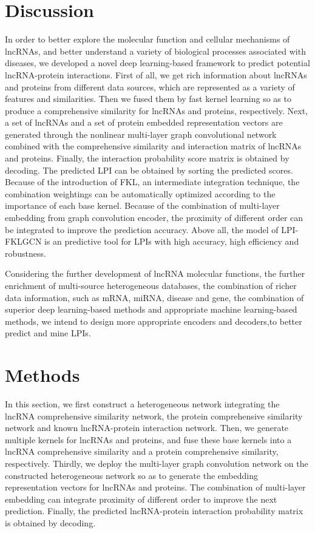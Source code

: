 \documentclass[fleqn,10pt]{wlscirep}
\begin{document}
\section*{Discussion}
In order to better explore the molecular function and cellular mechanisms of lncRNAs, and better understand a variety of biological processes associated with diseases, we developed a novel deep learning-based framework to predict potential lncRNA-protein interactions. First of all, we get rich information about lncRNAs and proteins from different data sources, which are represented as a variety of features and similarities. Then we fused them by fast kernel learning so as to produce a comprehensive similarity for lncRNAs and proteins, respectively. Next, a set of lncRNAs and a set of protein embedded representation vectors are generated through the nonlinear multi-layer graph convolutional network combined with the comprehensive similarity and interaction matrix of lncRNAs and proteins. Finally, the interaction probability score matrix is obtained by decoding. The predicted LPI can be obtained by sorting the predicted scores. Because of the introduction of FKL, an intermediate integration technique, the combination weightings can be automatically optimized according to the importance of each base kernel. Because of the combination of multi-layer embedding from graph convolution encoder, the proximity of different order can be integrated to improve the prediction accuracy. Above all, the model of LPI-FKLGCN is an predictive tool for LPIs with high accuracy, high efficiency and robustness.

Considering the further development of lncRNA molecular functions, the further enrichment of multi-source heterogeneous databases, the combination of richer data information, such as mRNA, miRNA, disease and gene, the combination of superior deep learning-based methods and appropriate machine learning-based methods, we intend to design more appropriate encoders and decoders,to better predict and mine LPIs.

\section*{Methods}
In this section, we first construct a heterogeneous network integrating the lncRNA comprehensive similarity network, the protein comprehensive similarity network and known lncRNA-protein interaction network. Then, we generate multiple kernels for lncRNAs and proteins, and fuse these base kernels into a lncRNA comprehensive similarity and a protein comprehensive similarity, respectively. Thirdly, we deploy the multi-layer graph convolution network on the constructed heterogeneous network so as to generate the embedding representation vectors for lncRNAs and proteins. The combination of multi-layer embedding can integrate proximity of different order to improve the next prediction. Finally, the predicted lncRNA-protein interaction probability matrix is obtained by decoding. 
\end{document}

